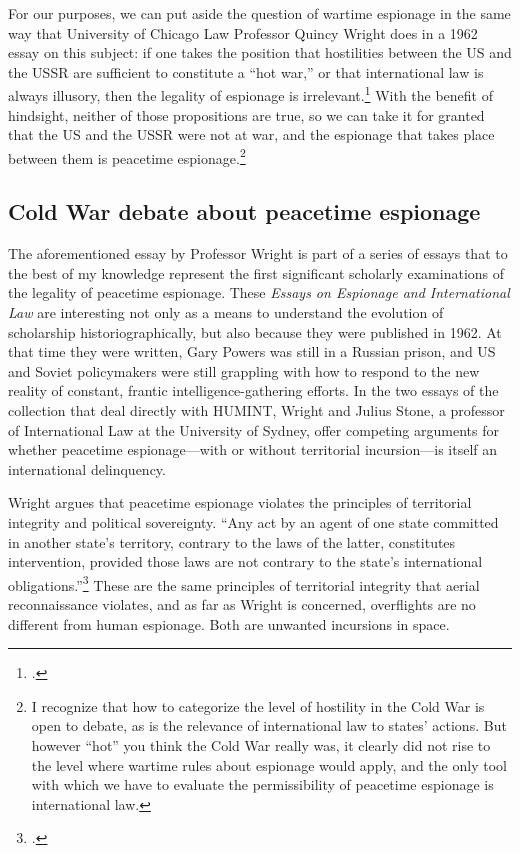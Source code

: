 \documentclass{memoir}
\begin{document}
\begin{refsegment}

For our purposes, we can put aside the question of wartime espionage in the same way that University of Chicago Law Professor Quincy Wright does in a 1962 essay on this subject: if one takes the position that hostilities between the US and the USSR are sufficient to constitute a ``hot war,'' or that international law is always illusory, then the legality of espionage is irrelevant.\footcite[p.~8]{wright_espionage_1962} With the benefit of hindsight, neither of those propositions are true, so we can take it for granted that the US and the USSR were not at war, and the espionage that takes place between them is peacetime espionage.\footnote{I recognize that how to categorize the level of hostility in the Cold War is open to debate, as is the relevance of international law to states' actions. But however ``hot'' you think the Cold War really was, it clearly did not rise to the level where wartime rules about espionage would apply, and the only tool with which we have to evaluate the permissibility of peacetime espionage is international law.}

\subsection{Cold War debate about peacetime espionage}
The aforementioned essay by Professor Wright is part of a series of essays that to the best of my knowledge represent the first significant scholarly examinations of the legality of peacetime espionage. These \emph{Essays on Espionage and International Law} are interesting not only as a means to understand the evolution of scholarship historiographically, but also because they were published in 1962. At that time they were written, Gary Powers was still in a Russian prison, and US and Soviet policymakers were still grappling with how to respond to the new reality of constant, frantic intelligence-gathering efforts. In the two essays of the collection that deal directly with HUMINT, Wright and Julius Stone, a professor of International Law at the University of Sydney, offer competing arguments for whether peacetime espionage---with or without territorial incursion---is itself an international delinquency.

Wright argues that peacetime espionage violates the principles of territorial integrity and political sovereignty. ``Any act by an agent of one state committed in another state's territory, contrary to the laws of the latter, constitutes intervention, provided those laws are not contrary to the state's international obligations.''\footcite[p.~13]{wright_espionage_1962} These are the same principles of territorial integrity that aerial reconnaissance violates, and as far as Wright is concerned, overflights are no different from human espionage. Both are unwanted incursions in space.


\end{refsegment}
\end{document}
